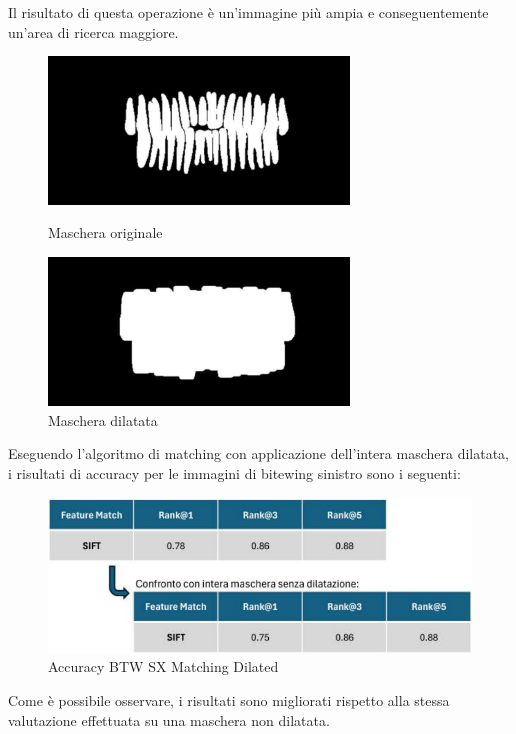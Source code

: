 \documentclass[12pt,a4paper,openright,twoside]{book}
\begin{document}
Il risultato di questa operazione è un'immagine più ampia e conseguentemente un'area di ricerca maggiore.
\begin{figure}[H]
    \centering
    \begin{minipage}{0.45\textwidth}
	\centering
    	\includegraphics[width=8cm]{figures/OPT_8.pdf}
    	\caption{Maschera originale}
    	\label{lab:Maschera Originale}
    \end{minipage}\hfill
    \begin{minipage}{0.45\textwidth}
    	\centering
    	\includegraphics[width=8cm]{figures/OPT_8_mask.pdf}
    	\caption{Maschera dilatata}
    	\label{lab:Maschera dilatata}
    \end{minipage}\hfill
\end{figure}

Eseguendo l'algoritmo di matching con applicazione dell'intera maschera dilatata, i risultati di accuracy per le immagini di bitewing sinistro sono i seguenti:
\begin{figure}[H]
	\centering
	\includegraphics{figures/sx6_1.pdf}
    	\caption{Accuracy BTW SX Matching Dilated}
	\label{fig:sx6}
\end{figure}
Come è possibile osservare, i risultati sono migliorati rispetto alla stessa valutazione effettuata su una maschera non dilatata.\\
\end{document}
